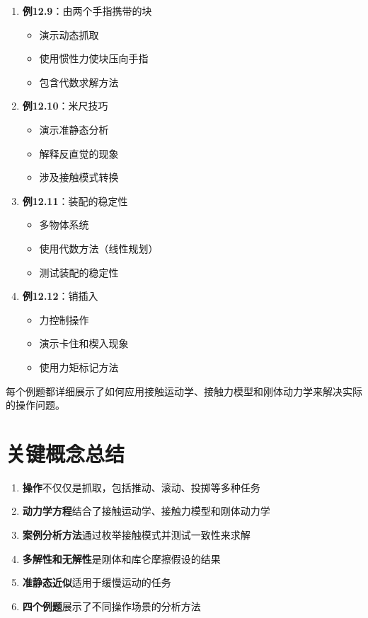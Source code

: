 \documentclass[12pt,a4paper]{article}
\begin{document}
\begin{enumerate}
    \item \textbf{例12.9}：由两个手指携带的块
    \begin{itemize}
        \item 演示动态抓取
        \item 使用惯性力使块压向手指
        \item 包含代数求解方法
    \end{itemize}
    
    \item \textbf{例12.10}：米尺技巧
    \begin{itemize}
        \item 演示准静态分析
        \item 解释反直觉的现象
        \item 涉及接触模式转换
    \end{itemize}
    
    \item \textbf{例12.11}：装配的稳定性
    \begin{itemize}
        \item 多物体系统
        \item 使用代数方法（线性规划）
        \item 测试装配的稳定性
    \end{itemize}
    
    \item \textbf{例12.12}：销插入
    \begin{itemize}
        \item 力控制操作
        \item 演示卡住和楔入现象
        \item 使用力矩标记方法
    \end{itemize}
\end{enumerate}

每个例题都详细展示了如何应用接触运动学、接触力模型和刚体动力学来解决实际的操作问题。

\section{关键概念总结}

\begin{enumerate}
    \item \textbf{操作}不仅仅是抓取，包括推动、滚动、投掷等多种任务
    
    \item \textbf{动力学方程}结合了接触运动学、接触力模型和刚体动力学
    
    \item \textbf{案例分析方法}通过枚举接触模式并测试一致性来求解
    
    \item \textbf{多解性和无解性}是刚体和库仑摩擦假设的结果
    
    \item \textbf{准静态近似}适用于缓慢运动的任务
    
    \item \textbf{四个例题}展示了不同操作场景的分析方法
\end{enumerate}
\end{document}
